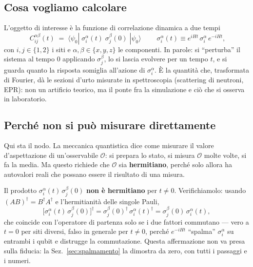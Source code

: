 \documentclass[11pt,a4paper]{article}
\begin{document}
\subsection{Cosa vogliamo calcolare}

L'oggetto di interesse è la funzione di correlazione dinamica a due tempi
\begin{equation}
\boxed{\;C_{ij}^{\alpha\beta}(t) \;=\; \langle\psi_0|\;\sigma_i^\alpha(t)\;\sigma_j^\beta(0)\;|\psi_0\rangle\;}
\qquad
\sigma_i^\alpha(t)\equiv e^{iHt}\,\sigma_i^\alpha\,e^{-iHt},
\label{eq:Cdef}
\end{equation}
con $i,j\in\{1,2\}$ i siti e $\alpha,\beta\in\{x,y,z\}$ le componenti. In parole: si
``perturba'' il sistema al tempo $0$ applicando $\sigma_j^\beta$, lo si lascia evolvere per un
tempo $t$, e si guarda quanto la risposta somiglia all'azione di $\sigma_i^\alpha$. È la
quantità che, trasformata di Fourier, dà le sezioni d'urto misurate in spettroscopia (scattering
di neutroni, EPR): non un artificio teorico, ma il ponte fra la simulazione e ciò che si osserva
in laboratorio.

\subsection{Perché non si può misurare direttamente}

Qui sta il nodo. La meccanica quantistica dice come misurare il valore d'aspettazione di
un'osservabile $\mathcal O$: si prepara lo stato, si misura $\mathcal O$ molte volte, si fa la
media. Ma questo richiede che $\mathcal O$ sia \textbf{hermitiano}, perché solo allora ha
autovalori reali che possano essere il risultato di una misura.

Il prodotto $\sigma_i^\alpha(t)\,\sigma_j^\beta(0)$ \textbf{non è hermitiano} per $t\neq0$.
Verifichiamolo: usando $(AB)^\dagger=B^\dagger A^\dagger$ e l'hermitianità delle singole Pauli,
\begin{equation}
\big[\sigma_i^\alpha(t)\,\sigma_j^\beta(0)\big]^\dagger
= \sigma_j^\beta(0)^\dagger\,\sigma_i^\alpha(t)^\dagger
= \sigma_j^\beta(0)\,\sigma_i^\alpha(t),
\end{equation}
che coincide con l'operatore di partenza solo se i due fattori commutano --- vero a $t=0$ per
siti diversi, falso in generale per $t\neq0$, perché $e^{-iHt}$ ``spalma'' $\sigma_i^\alpha$ su
entrambi i qubit e distrugge la commutazione. Questa affermazione non va presa sulla fiducia:
la Sez.~\ref{sec:spalmamento} la dimostra da zero, con tutti i passaggi e i numeri.
\end{document}

